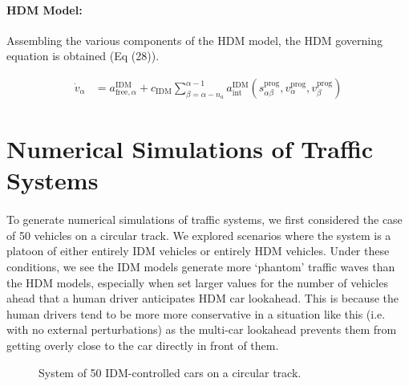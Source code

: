 \documentclass[12pt]{article}
\begin{document}
\paragraph{HDM Model:}
Assembling the various components of the HDM model, the HDM governing equation is obtained (Eq (28)).
\begin{mymathbox}[ams gather, title=HDM Governing Equation,colframe=blue!30!black]
  \begin{align}
\dot v_\alpha &= a_{\text{free},\alpha}^{\text{IDM}}+c_{\text{IDM}}\sum_{\beta=\alpha-n_a}^{\alpha-1}a_{\text{int}}^{\text{IDM}}(s^{\text{prog}}_{\alpha\beta},v^{\text{prog}}_\alpha,v^{\text{prog}}_\beta)
  \end{align}
\end{mymathbox}
\section{Numerical Simulations of Traffic Systems}

\paragraph{}To generate numerical simulations of traffic systems, we first considered the case of 50 vehicles on a circular track. We explored scenarios where the system is a platoon of either entirely IDM vehicles or entirely HDM vehicles. Under these conditions, we see the IDM models generate more `phantom' traffic waves than the HDM models, especially when set larger values for the number of vehicles ahead that a human driver anticipates HDM car lookahead. This is because the human drivers tend to be more more conservative in a situation like this (i.e. with no external perturbations) as the multi-car lookahead prevents them from getting overly close to the car directly in front of them.

\begin{figure}[H]
  \centering
  \caption{System of 50 IDM-controlled cars on a circular track.}
\end{figure}
\end{document}
